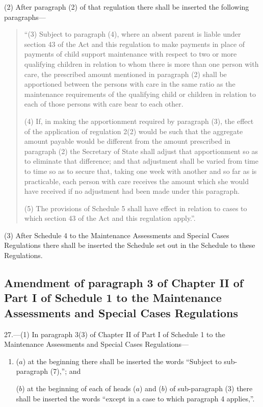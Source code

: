 \documentclass[12pt,a4paper]{article}
\begin{document}
(2) After paragraph (2) of that regulation there shall be inserted the following paragraphs---
\begin{quotation}
“(3) Subject to paragraph (4), where an absent parent is liable under section 43 of the Act and this regulation to make payments in place of payments of child support maintenance with respect to two or more qualifying children in relation to whom there is more than one person with care, the prescribed amount mentioned in paragraph (2) shall be apportioned between the persons with care in the same ratio as the maintenance requirements of the qualifying child or children in relation to each of those persons with care bear to each other.

(4) If, in making the apportionment required by paragraph (3), the effect of the application of regulation 2(2) would be such that the aggregate amount payable would be different from the amount prescribed in paragraph (2) the Secretary of State shall adjust that apportionment so as to eliminate that difference; and that adjustment shall be varied from time to time so as to secure that, taking one week with another and so far as is practicable, each person with care receives the amount which she would have received if no adjustment had been made under this paragraph.

(5) The provisions of Schedule 5 shall have effect in relation to cases to which section 43 of the Act and this regulation apply.”.
\end{quotation}

(3) After Schedule 4 to the Maintenance Assessments and Special Cases Regulations there shall be inserted the Schedule set out in the Schedule to these Regulations.

\subsection[27. Amendment of paragraph 3 of Chapter II of Part I of Schedule 1 to the Maintenance Assessments and Special Cases Regulations]{Amendment of paragraph 3 of Chapter II of Part I of Schedule 1 to the Maintenance Assessments and Special Cases Regulations}

27.—(1) In paragraph 3(3) of Chapter II of Part I of Schedule 1 to the Maintenance Assessments and Special Cases Regulations---
\begin{enumerate}\item[]
($a$) at the beginning there shall be inserted the words “Subject to sub-paragraph (7),”; and

($b$) at the beginning of each of heads ($a$) and ($b$) of sub-paragraph (3) there shall be inserted the words “except in a case to which paragraph 4 applies,”.
\end{enumerate}
\end{document}
